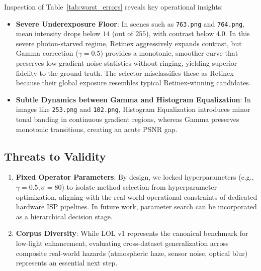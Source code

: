 \documentclass[journal]{IEEEtran}
\begin{document}
Inspection of Table~\ref{tab:worst_errors} reveals key operational insights:
\begin{itemize}
    \item \textbf{Severe Underexposure Floor}: In scenes such as \texttt{763.png} and \texttt{764.png}, mean intensity drops below $14$ (out of $255$), with contrast below $4.0$. In this severe photon-starved regime, Retinex aggressively expands contrast, but Gamma correction ($\gamma = 0.5$) provides a monotonic, smoother curve that preserves low-gradient noise statistics without ringing, yielding superior fidelity to the ground truth. The selector misclassifies these as Retinex because their global exposure resembles typical Retinex-winning candidates.
    \item \textbf{Subtle Dynamics between Gamma and Histogram Equalization}: In images like \texttt{253.png} and \texttt{102.png}, Histogram Equalization introduces minor tonal banding in continuous gradient regions, whereas Gamma preserves monotonic transitions, creating an acute PSNR gap.
\end{itemize}

\subsection{Threats to Validity}
\begin{enumerate}
    \item \textbf{Fixed Operator Parameters}: By design, we locked hyperparameters (e.g., $\gamma=0.5, \sigma=80$) to isolate method selection from hyperparameter optimization, aligning with the real-world operational constraints of dedicated hardware ISP pipelines. In future work, parameter search can be incorporated as a hierarchical decision stage.
    \item \textbf{Corpus Diversity}: While LOL v1 represents the canonical benchmark for low-light enhancement, evaluating cross-dataset generalization across composite real-world hazards (atmospheric haze, sensor noise, optical blur) represents an essential next step.
\end{enumerate}
\end{document}
